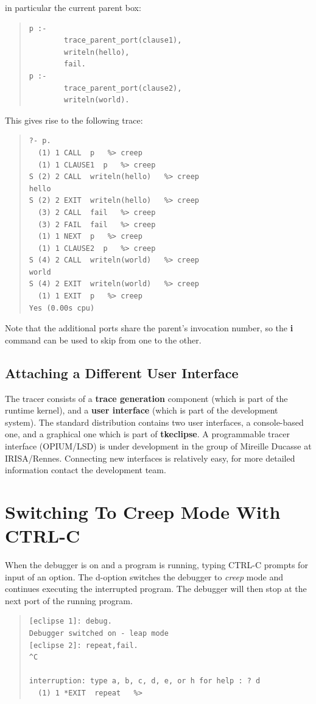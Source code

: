 in particular the current parent box:
\begin{quote}\begin{verbatim}
p :-
        trace_parent_port(clause1),  
        writeln(hello),
        fail.
p :-
        trace_parent_port(clause2),  
        writeln(world).
\end{verbatim}\end{quote}
This gives rise to the following trace:
\begin{quote}\begin{verbatim}
?- p.
  (1) 1 CALL  p   %> creep
  (1) 1 CLAUSE1  p   %> creep
S (2) 2 CALL  writeln(hello)   %> creep
hello
S (2) 2 EXIT  writeln(hello)   %> creep
  (3) 2 CALL  fail   %> creep
  (3) 2 FAIL  fail   %> creep
  (1) 1 NEXT  p   %> creep
  (1) 1 CLAUSE2  p   %> creep
S (4) 2 CALL  writeln(world)   %> creep
world
S (4) 2 EXIT  writeln(world)   %> creep
  (1) 1 EXIT  p   %> creep
Yes (0.00s cpu)
\end{verbatim}\end{quote}
Note that the additional ports share the parent's invocation number,
so the {\bf i} command can be used to skip from one to the other.


\subsection{Attaching a Different User Interface}

The tracer consists of a {\bf trace generation} component (which is part of the
{\eclipse} runtime kernel), and a {\bf user interface} (which is part of the
development system).  The standard {\eclipse} distribution contains two
user interfaces, a console-based one, and a graphical one which is part
of {\bf tkeclipse}.  A programmable tracer interface (OPIUM/LSD) is under
development in the group of Mireille Ducasse at IRISA/Rennes.
Connecting new interfaces is relatively easy, for more detailed
information contact the {\eclipse} development team.



\section{Switching To Creep Mode With CTRL-C}

When the debugger is on and a program is running, typing CTRL-C
prompts for input of an option. The d-option switches the debugger to
{\it creep} mode and continues executing the interrupted program.  The
debugger will then stop at the next port of the running program.
\begin{quote}\begin{verbatim}
[eclipse 1]: debug.
Debugger switched on - leap mode
[eclipse 2]: repeat,fail.
^C

interruption: type a, b, c, d, e, or h for help : ? d
  (1) 1 *EXIT  repeat   %> 
\end{verbatim}\end{quote}

